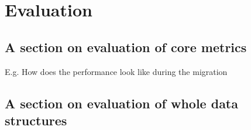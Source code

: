 \chapter{Evaluation}
\label{chap:evaluation}

\section{A section on evaluation of core metrics}
E.g. How does the performance look like during the migration

\section{A section on evaluation of whole data structures}


